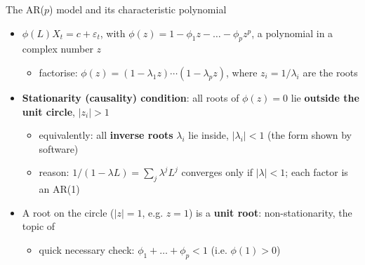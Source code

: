 \begin{frame}{The AR($p$) model and its characteristic polynomial}
\itemsize{\small}
\begin{itemize}
    \item $\phi(L)X_t = c + \varepsilon_t$, with $\phi(z) = 1 - \phi_1z - \dots - \phi_pz^p$, a polynomial in a complex number $z$
    \begin{itemize}
        \item factorise: $\phi(z) = (1 - \lambda_1z)\cdots(1 - \lambda_pz)$, where $z_i = 1/\lambda_i$ are the roots
    \end{itemize}
    \item \textbf{Stationarity (causality) condition}: all roots of $\phi(z) = 0$ lie \textbf{outside the unit circle}, $|z_i| > 1$
    \begin{itemize}
        \item equivalently: all \textbf{inverse roots} $\lambda_i$ lie inside, $|\lambda_i| < 1$ (the form shown by software)
        \item reason: $1/(1 - \lambda L) = \sum_j\lambda^jL^j$ converges only if $|\lambda| < 1$; each factor is an AR(1)
    \end{itemize}
    \item A root on the circle ($|z| = 1$, e.g. $z = 1$) is a \textbf{unit root}: non-stationarity, the topic of 
    \begin{itemize}
        \item quick necessary check: $\phi_1 + \dots + \phi_p < 1$ (i.e. $\phi(1) > 0$)
    \end{itemize}
\end{itemize}
\end{frame}

